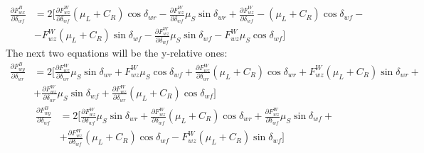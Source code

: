 		\begin{equation} \label{Fwx su deltaF}
			\begin{split}
				\frac{\partial F_{wx}^{B}}{\partial \delta_{wf}} &= 2 [\frac{\partial F_{wz}^{W}}{\partial \delta_{wf}} (\mu_{L}+C_{R}) \cos\delta_{wr} - \frac{\partial F_{wz}^{W}}{\partial \delta_{wf}} \mu_{S} \sin \delta_{wr} + \frac{\partial F_{wz}^{W}}{\partial \delta_{wf}} - (\mu_{L}+C_{R}) \cos\delta_{wf} - \\
				&- F_{wz}^{W} (\mu_{L}+C_{R})\sin\delta_{wf}
				- \frac{\partial F_{wz}^{W}}{\partial \delta_{wf}} \mu_{S} \sin \delta_{wf} - F_{wz}^{W} \mu_{S}\cos\delta_{wf}]
			\end{split}
		\end{equation}
	The next two equations will be the y-relative ones:
		\begin{equation} \label{Fwy su deltaR}
			\begin{split}
				\frac{\partial F_{wy}^{B}}{\partial \delta_{wr}} &= 2 [\frac{\partial F_{wz}^{W}}{\partial \delta_{wr}} \mu_{S} \sin \delta_{wr} + F_{wz}^{W} \mu_{S}\cos\delta_{wf} + \frac{\partial F_{wz}^{W}}{\partial \delta_{wr}} (\mu_{L}+C_{R}) \cos\delta_{wr} + F_{wz}^{W}(\mu_{L}+C_{R}) \sin\delta_{wr}+ \\ &+ \frac{\partial F_{wz}^{W}}{\partial \delta_{wr}} \mu_{S} \sin \delta_{wf} + \frac{\partial F_{wz}^{W}}{\partial \delta_{wr}} (\mu_{L}+C_{R})\cos\delta_{wf}]
			\end{split}
		\end{equation}
		\begin{equation} \label{Fwy su deltaF}
			\begin{split}
				\frac{\partial F_{wy}^{B}}{\partial \delta_{wf}} &= 2 [\frac{\partial F_{wz}^{W}}{\partial \delta_{wf}} \mu_{S} \sin \delta_{wr} + \frac{\partial F_{wz}^{W}}{\partial \delta_{wf}} (\mu_{L}+C_{R}) \cos\delta_{wr} + \frac{\partial F_{wz}^{W}}{\partial \delta_{wf}} \mu_{S} \sin \delta_{wf}+ \\ &+ \frac{\partial F_{wz}^{W}}{\partial \delta_{wf}} (\mu_{L}+C_{R})\cos\delta_{wf} - F_{wz}^{W} (\mu_{L}+C_{R}) \sin\delta_{wf}]
			\end{split}
		\end{equation}
